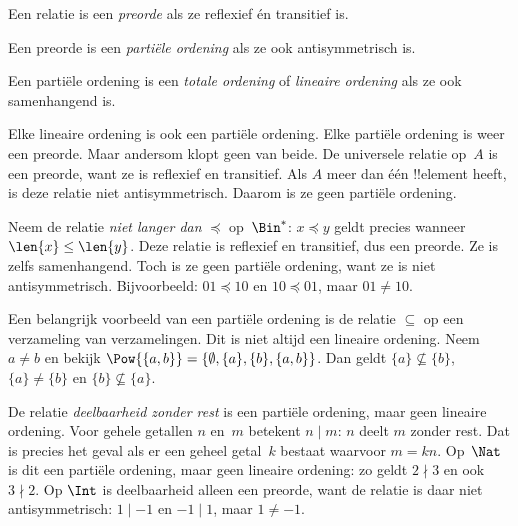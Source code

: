 \documentclass[openany]{memoir}
\begin{document}
\begin{defn}[Preorde]
Een relatie is een \emph{preorde} als ze reflexief én transitief is.  
\end{defn}

\begin{defn}
Een preorde is een \emph{partiële ordening} als ze ook antisymmetrisch is.
\end{defn}

\begin{defn}
Een partiële ordening is een \emph{totale ordening} of \emph{lineaire
ordening} als ze ook samenhangend is.
\end{defn}

\begin{ex}
Elke lineaire ordening is ook een partiële ordening. Elke partiële ordening is
weer een preorde. Maar andersom klopt geen van beide. De universele relatie
op~$A$ is een preorde, want ze is reflexief en transitief. Als $A$ meer dan één
!!{element} heeft, is deze relatie niet antisymmetrisch. Daarom is ze geen
partiële ordening.
\end{ex}

\begin{ex}
Neem de relatie \emph{niet langer dan} $\preccurlyeq$ op~$\Bin^*$:
$x \preccurlyeq y$ geldt precies wanneer $\len{x} \le \len{y}$. Deze relatie
is reflexief en transitief, dus een preorde. Ze is zelfs samenhangend. Toch is
ze geen partiële ordening, want ze is niet antisymmetrisch. Bijvoorbeeld: $01
\preccurlyeq 10$ en $10 \preccurlyeq 01$, maar $01 \neq 10$.
\end{ex}

\begin{ex}
Een belangrijk voorbeeld van een partiële ordening is de relatie $\subseteq$ op
een verzameling van verzamelingen. Dit is niet altijd een lineaire ordening.
Neem $a \neq b$ en bekijk
$\Pow{\{a, b\}} = \{\emptyset, \{a\}, \{b\}, \{a,b\}\}$. Dan geldt
$\{a\} \nsubseteq \{b\}$, $\{a\} \neq \{b\}$ en $\{b\}
\nsubseteq \{a\}$.
\end{ex}

\begin{ex}
De relatie \emph{deelbaarheid zonder rest} is een partiële ordening, maar geen
lineaire ordening. Voor gehele getallen $n$ en~$m$ betekent $n \mid m$: $n$
deelt $m$ zonder rest. Dat is precies het geval als er een geheel getal~$k$
bestaat waarvoor $m = kn$. Op~$\Nat$ is dit een partiële ordening, maar geen
lineaire ordening: zo geldt $2 \nmid 3$ en ook $3 \nmid 2$. Op $\Int$ is
deelbaarheid alleen een preorde, want de relatie is daar niet antisymmetrisch:
$1 \mid -1$ en $-1 \mid 1$, maar $1 \neq -1$.
\end{ex}
\end{document}
